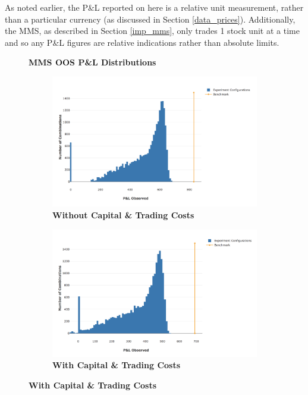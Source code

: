 \documentclass[a4paper,11pt,oneside]{article}
\theoremstyle{plain}
\theoremstyle{definition}
\begin{document}
	As noted earlier, the P\&L reported on here is a relative unit measurement, rather than a particular currency (as discussed in Section \ref{data_prices}). Additionally, the MMS, as described in Section \ref{imp_mms}, only trades 1 stock unit at a time and so any P\&L figures are relative indications rather than absolute limits.
	
	
	\begin{figure}[H]
		\centering
		\textbf{MMS OOS P\&L Distributions}
		\begin{subfigure}{.44\textwidth}
			\centering 
			\includegraphics[scale=0.3]{images/results/mms/profits_nocost.png} 
			\caption{\textbf{Without Capital \& Trading Costs}}
			\label{figure-results_pl_pdf_nocapital}
		\end{subfigure}%
		\begin{subfigure}{.5\textwidth}
			\includegraphics[scale=0.31]{images/results/mms/profits_cost.png} 
			\caption{\textbf{With Capital \& Trading Costs}}
			\label{figure-results_pl_pdf_cost_capital}

\end{subfigure}
\end{figure}
\end{document}
